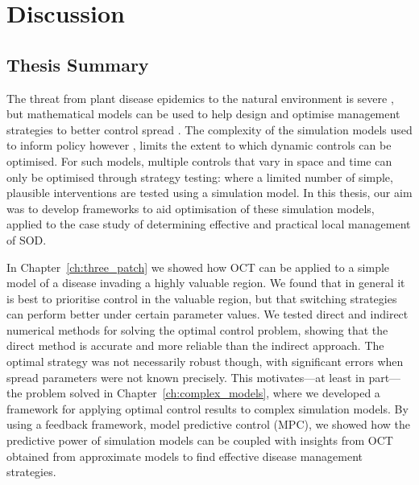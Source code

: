 %
\chapter{Discussion\label{ch:discussion}}

\section{Thesis Summary}

The threat from plant disease epidemics to the natural environment is severe \citep{freer_tree_2017}, but mathematical models can be used to help design and optimise management strategies to better control spread \citep{lofgren_opinion_2014,cunniffe_optimising_2015}. The complexity of the simulation models used to inform policy however \citep[e.g.][]{defra_chalara_2013}, limits the extent to which dynamic controls can be optimised. For such models, multiple controls that vary in space and time can only be optimised through strategy testing: where a limited number of simple, plausible interventions are tested using a simulation model. In this thesis, our aim was to develop frameworks to aid optimisation of these simulation models, applied to the case study of determining effective and practical local management of SOD.

In Chapter~\ref{ch:three_patch} we showed how OCT can be applied to a simple model of a disease invading a highly valuable region. We found that in general it is best to prioritise control in the valuable region, but that switching strategies can perform better under certain parameter values. We tested direct and indirect numerical methods for solving the optimal control problem, showing that the direct method is accurate and more reliable than the indirect approach. The optimal strategy was not necessarily robust though, with significant errors when spread parameters were not known precisely. This motivates---at least in part---the problem solved in Chapter~\ref{ch:complex_models}, where we developed a framework for applying optimal control results to complex simulation models. By using a feedback framework, model predictive control (MPC), we showed how the predictive power of simulation models can be coupled with insights from OCT obtained from approximate models to find effective disease management strategies.

